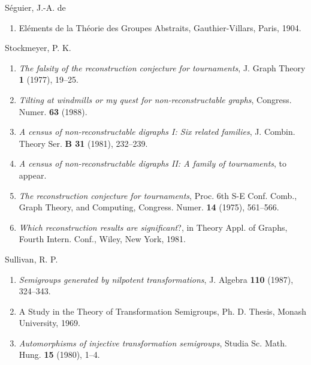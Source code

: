 \documentclass{surv-l}
\numberwithin{equation}{section}
\numberwithin{table}{section}
\numberwithin{figure}{section}
\theoremstyle{plain}
\theoremstyle{definition}
\begin{document}
\begin{thebibliography}{}
\item[] S\'{e}guier, J.-A. de
\begin{enumerate}
\item \label{bib70} El\'{e}ments de la Th\'{e}orie des Groupes Abstraits,
Gauthier-Villars, Paris, 1904.
\end{enumerate}

\item[] Stockmeyer, P. K.
\begin{enumerate}
\item \label{bib71} \emph{The falsity of the reconstruction conjecture for
tournaments}, J. Graph Theory \textbf{1} (1977), 19--25.

\item \label{bib71a} \emph{Tilting at windmills or my quest for
non-reconstructable graphs}, Congress. Numer. \textbf{63}
(1988).

\item \label{bib71b} \emph{A census of non-reconstructable digraphs I:
Six related families}, J. Combin. Theory Ser. \textbf{B
31} (1981), 232--239.

\item \label{bib71c} \emph{A census of non-reconstructable digraphs II: A
family of tournaments}, to appear.

\item \label{bib71d} \emph{The reconstruction conjecture for tournaments},
Proc. 6th S-E Conf. Comb., Graph Theory, and Computing,
Congress. Numer. \textbf{14} (1975), 561--566.

\item \label{bib71e} \emph{Which reconstruction results are significant}?, in
Theory Appl. of Graphs, Fourth Intern. Conf., Wiley, New
York, 1981.
\end{enumerate}

\item[] Sullivan, R. P.
\begin{enumerate}
\item \label{bib72} \emph{Semigroups generated by nilpotent
transformations}, J. Algebra \textbf{110} (1987),
324--343.

\item \label{bib72a} A Study in the Theory of Transformation Semigroups, Ph.
D. Thesis, Monash University, 1969.

\item \label{bib72b} \emph{Automorphisms of injective transformation
semigroups}, Studia Sc. Math. Hung. \textbf{15} (1980),
1--4.
\end{enumerate}


\end{thebibliography}
\end{document}
